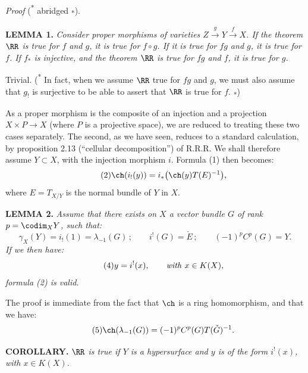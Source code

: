 \emph{Proof} (\textsuperscript{*} abridged \textsubscript{*}).

\textbf{LEMMA 1.} \emph{Consider proper morphisms of varieties \(Z\xrightarrow{g}Y\xrightarrow{f}X\). If the theorem \(\RR\) is true for \(f\) and \(g\), it is true for \(f\circ g\). If it is true for \(fg\) and \(g\), it is true for \(f\). If \(f_*\) is injective, and the theorem \(\RR\) is true for \(fg\) and \(f\), it is true for \(g\).}

Trivial. (\textsuperscript{*} In fact, when we assume \(\RR\) true for \(fg\) and \(g\), we must also assume that \(g_!\) is surjective to be able to assert that \(\RR\) is true for \(f\). \textsubscript{*})

As a proper morphism is the composite of an injection and a projection \(X\times P\longrightarrow X\) (where \(P\) is a projective space), we are reduced to treating these two cases separately. The second, as we have seen, reduces to a standard calculation, by proposition 2.13 (``cellular decomposition'') of R.R.R. We shall therefore assume \(Y\subset X\), with the injection morphism \(i\). Formula (1) then becomes:
\begin{equation}\tag{2}
  \ch(i_!(y))=i_*\bigl(\ch(y)T(E)^{-1}\bigr),
\end{equation}
where \(E=T_{X/Y}\) is the normal bundle of \(Y\) in \(X\).

%
\textbf{LEMMA 2.} \emph{Assume that there exists on \(X\) a vector bundle \(G\) of rank \(p=\codim_XY\), such that:}
\begin{equation}\tag{3}
  \gamma_X(Y)=i_!(1)=\lambda_{-1}(G)\,;\qquad
  i^!(G)=\check E\,;\qquad
  (-1)^pC^p(G)=Y.
\end{equation}
\emph{If we then have:}
\begin{equation}\tag{4}
  y=i^!(x),\qquad \text{\emph{with} }x\in K(X),
\end{equation}
\emph{formula (2) is valid.}

The proof is immediate from the fact that \(\ch\) is a ring homomorphism, and that we have:
\begin{equation}\tag{5}
  \ch(\lambda_{-1}(G))=(-1)^pC^p(G)T(\check G)^{-1}.
\end{equation}

\textbf{COROLLARY.} \emph{\(\RR\) is true if \(Y\) is a hypersurface and \(y\) is of the form \(i^!(x)\), with \(x\in K(X)\).}


